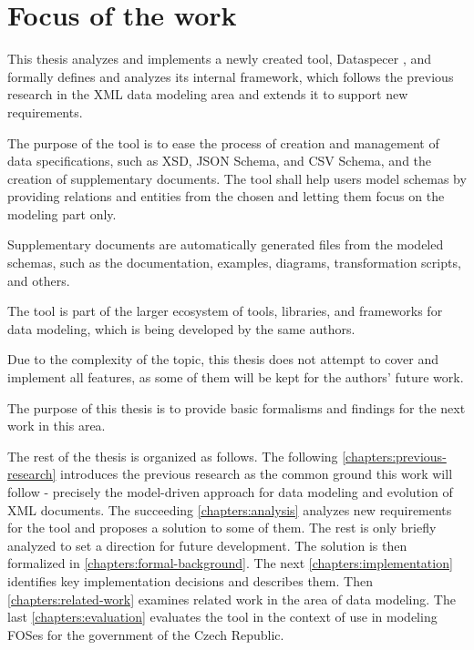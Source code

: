 \section*{Focus of the work}

This thesis analyzes and implements a newly created tool, Dataspecer \cite{dataspecer}, and formally defines and analyzes its internal framework, which follows the previous research \cite{necasky2007xsem, necasky2012conceptual, nevcasky2012evolution, xcase, exolutio} in the XML data modeling area and extends it to support new requirements.

The purpose of the tool is to ease the process of creation and management of data specifications, such as XSD, JSON Schema, and CSV Schema, and the creation of supplementary documents. The tool shall help users model schemas by providing relations and entities from the chosen and letting them focus on the modeling part only.

Supplementary documents are automatically generated files from the modeled schemas, such as the documentation, examples, diagrams, transformation scripts, and others.

\medskip

The tool is part of the larger ecosystem of tools, libraries, and frameworks for data modeling, which is being developed by the same authors.

Due to the complexity of the topic, this thesis does not attempt to cover and implement all features, as some of them will be kept for the authors' future work.

The purpose of this thesis is to provide basic formalisms and findings for the next work in this area.

\bigskip

The rest of the thesis is organized as follows. The following \autoref{chapters:previous-research} introduces the previous research as the common ground this work will follow - precisely the model-driven approach for data modeling and evolution of XML documents. The succeeding \autoref{chapters:analysis} analyzes new requirements for the tool and proposes a solution to some of them. The rest is only briefly analyzed to set a direction for future development. The solution is then formalized in \autoref{chapters:formal-background}. The next \autoref{chapters:implementation} identifies key implementation decisions and describes them. Then \autoref{chapters:related-work} examines related work in the area of data modeling. The last \autoref{chapters:evaluation} evaluates the tool in the context of use in modeling FOSes for the government of the Czech Republic.
